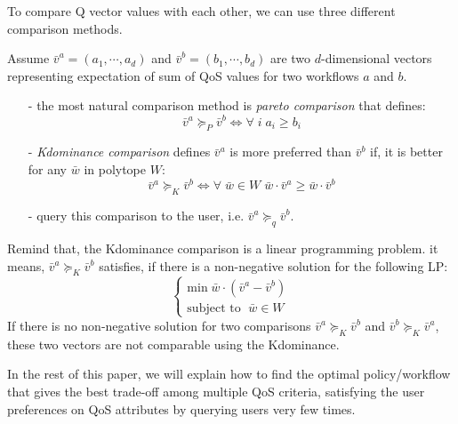 \documentclass[10pt,journal,compsoc]{IEEEtran}
\begin{document}
To compare Q vector values with each other, we can use three different comparison methods.

Assume $\bar{v}^a = (a_1, \cdots, a_d)$  and $\bar{v}^b = (b_1, \cdots, b_d)$ are two $d$-dimensional vectors representing expectation of sum of QoS values for two workflows $a$ and $b$. 

\begin{itemize}
\item[-] the most natural comparison method is \emph{pareto comparison} that defines:
\begin{equation} \label{eq:pareto}
\bar{v}^a \succeq_P \bar{v}^b \Leftrightarrow \forall \; i \; a_i \geq b_i
\end{equation}\label{eq:kdom}
\item[-] \emph{Kdominance comparison} defines $\bar{v}^a$ is more preferred than $\bar{v}^b$ if, it is better for any $\bar{w}$ in polytope $W$:
\begin{equation}
\bar{v}^a \succeq_K \bar{v}^b \Leftrightarrow \forall \; \bar{w} \in W \; \bar{w} \cdot \bar{v}^a \geq \bar{w} \cdot \bar{v}^b
\end{equation}\label{eq:queryuser}
\item[-] query this comparison to the user, i.e. $\bar{v}^a  \succeq_q \bar{v}^b$. 
\end{itemize} 

Remind that, the Kdominance comparison is a linear programming problem. it means, $\bar{v}^a  \succeq_K \bar{v}^b$ satisfies, if there is a non-negative solution for the following LP:
\begin{equation}
\left\{
\begin{array}{ll}
\text{min} \; \bar{w} \cdot (\bar{v}^a - \bar{v}^b) \\
\text{subject to } \; \bar{w} \in W
\end{array}
\right.
\end{equation}
If there is no non-negative solution for two comparisons $\bar{v}^a  \succeq_K \bar{v}^b$ and $\bar{v}^b  \succeq_K \bar{v}^a$, these two vectors are not comparable using the Kdominance. 

In the rest of this paper, we will explain how to find the optimal policy/workflow that gives the best trade-off among multiple QoS criteria, satisfying the user preferences on QoS attributes by querying users very few times. %
\end{document}
